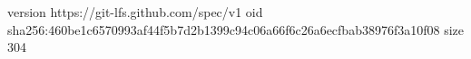 version https://git-lfs.github.com/spec/v1
oid sha256:460be1c6570993af44f5b7d2b1399c94c06a66f6c26a6ecfbab38976f3a10f08
size 304
